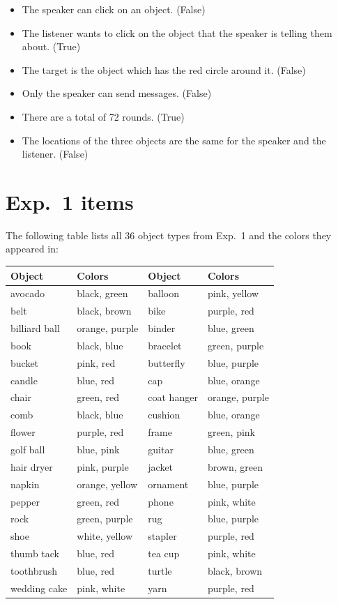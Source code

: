 \documentclass[11pt]{article}
\begin{document}
\begin{itemize}
	\item The speaker can click on an object. (False)
	\item The listener wants to click on the object that the speaker is
  telling them about. (True)
  \item  The target is the object which has the red circle around it. (False)
  \item Only the speaker can send messages. (False)
  \item There are a total of 72 rounds. (True)
  \item The locations of the three objects are the same for the speaker and the listener. (False)
\end{itemize}


\section{Exp.~1 items}
\label{app:itemtypes}

The following table lists all 36 object types from Exp.~1 and the colors they appeared in:

\begin{tabular}{l l l l}
\toprule
Object & Colors & Object & Colors \\
\midrule
avocado & black, green & balloon & pink, yellow \\
belt & black, brown & bike & purple, red\\
billiard ball & orange, purple & binder & blue, green \\
book & black, blue & bracelet & green, purple \\
bucket & pink, red & butterfly & blue, purple\\
candle & blue, red & cap & blue, orange \\
chair & green, red & coat hanger & orange, purple \\
comb & black, blue & cushion & blue, orange\\
flower & purple, red & frame & green, pink \\
golf ball & blue, pink & guitar & blue, green\\
hair dryer & pink, purple & jacket & brown, green\\
napkin & orange, yellow & ornament & blue, purple\\
pepper & green, red & phone & pink, white\\
rock & green, purple & rug & blue, purple \\
shoe & white, yellow & stapler & purple, red\\
thumb tack & blue, red & tea cup & pink, white \\
toothbrush & blue, red & turtle & black, brown \\
wedding cake & pink, white & yarn & purple, red\\
\bottomrule
\end{tabular}
\end{document}
